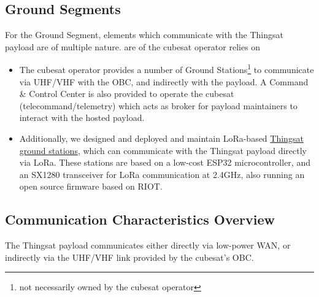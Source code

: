 \subsection*{Ground Segments}
For the Ground Segment, elements which communicate with the Thingsat payload are of multiple nature. are of the cubesat operator relies on 
\begin{itemize}
\item The cubesat operator provides a number of Ground Stations\footnote{not necessarily owned by the cubesat operator} to communicate via UHF/VHF with the OBC, and indirectly with the payload. 
A Command \& Control Center is also provided to operate the cubesat (telecommand/telemetry) which acts as broker for payload maintainers to interact with the hosted payload.
\item Additionally, we designed and deployed and maintain LoRa-based  \href{https://github.com/thingsat/tinygs_2g4station}{Thingsat ground stations}, which can communicate with the Thingsat payload directly via LoRa. These stations are based on a low-cost ESP32 microcontroller, and an SX1280 transceiver for LoRa communication at 2.4GHz, also running an open source firmware based on RIOT.
\end{itemize}


\subsection{Communication Characteristics Overview}
\label{sec:thingsat-comm-characteristics}

The Thingsat payload communicates either directly via low-power WAN, or indirectly via the UHF/VHF link provided by the cubesat's OBC.

